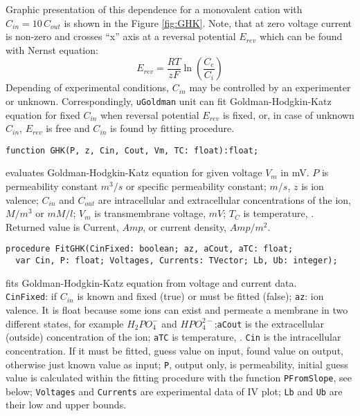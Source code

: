 \documentclass[12pt,a4paper,oneside]{article}
\newcommand{\code}[1]{\texttt{#1}}
\begin{document}
Graphic presentation of this dependence for a monovalent cation with $C_{in}=10\,C_{out}$ is shown in the Figure \ref{fig:GHK}.
Note, that at zero voltage current is non-zero and crosses ``x'' axis at a reversal potential $E_{rev}$ which can be found with Nernst equation:
\begin{equation}\label{eq:nernst}
E_{rev}=\dfrac{RT}{zF}\ln\left(\dfrac{C_{e}}{C_{i}}\right)
\end{equation}
Depending of experimental conditions, $C_{in}$ may be controlled by an experimenter or unknown. Correspondingly, \code{uGoldman} unit can fit Goldman-Hodgkin-Katz equation for fixed $C_{in}$ when reversal potential $E_{rev}$ is fixed, or, in case of unknown $C_{in}$, $E_{rev}$ is free and $C_{in}$ is found by fitting procedure. 
\begin{verbatim}
function GHK(P, z, Cin, Cout, Vm, TC: float):float;
\end{verbatim}
evaluates Goldman-Hodgkin-Katz equation for given voltage $V_m$ in mV. $P$ is permeability constant $m^3/s$ or specific permeability constant; $m/s$, $z$ is ion valence; $C_{in}$ and $C_{out}$ are intracellular and extracellular concentrations of the ion, $M/m^3$ or $mM/l$; $V_m$ is transmembrane voltage, $mV$; $T_C$ is temperature, \celsius. Returned value is Current, $Amp$, or current density, $Amp/m^2$.
\begin{verbatim}
procedure FitGHK(CinFixed: boolean; az, aCout, aTC: float; 
  var Cin, P: float; Voltages, Currents: TVector; Lb, Ub: integer);
\end{verbatim}
fits Goldman-Hodgkin-Katz equation from voltage and current data.\\
\code{CinFixed}: if $C_{in}$ is known and fixed (true) or must be fitted (false); \code{az}: ion valence. It is float because some ions can exist and permeate a membrane in two different states, for example $H_2PO_{4}^-$ and $HPO_{4}^{2-}$;\code{aCout} is the extracellular (outside) concentration of the ion; \code{aTC} is temperature, \celsius. \code{Cin} is the intracellular concentration. If it must be fitted, guess value on input, found value on output, otherwise just known value as input; \code{P}, output only, is permeability, initial guess value is calculated within the fitting procedure with the function \code{PFromSlope}, see below; \code{Voltages} and \code{Currents} are experimental data of IV plot; \code{Lb} and \code{Ub} are their low and upper bounds.
\end{document}
